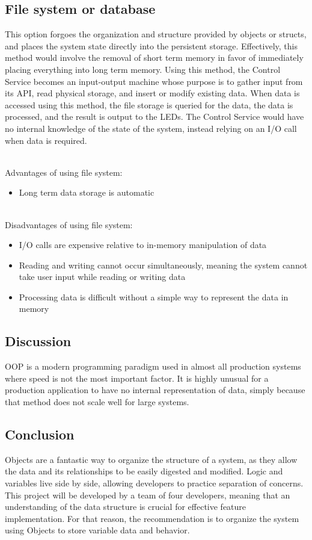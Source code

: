 \documentclass[onecolumn, draftclsnofoot,10pt, compsoc]{IEEEtran}
\begin{document}
			\subsection{File system or database}
			This option forgoes the organization and structure provided by objects or structs, and places the system state directly into the persistent storage.
			Effectively, this method would involve the removal of short term memory in favor of immediately placing everything into long term memory.
			Using this method, the Control Service becomes an input-output machine whose purpose is to gather input from its API, read physical storage, and insert or modify existing data.
			When data is accessed using this method, the file storage is queried for the data, the data is processed, and the result is output to the LEDs.
			The Control Service would have no internal knowledge of the state of the system, instead relying on an I/O call when data is required.

			\noindent \\Advantages of using file system:
			\begin{itemize}
				\item Long term data storage is automatic
			\end{itemize}

			\noindent \\Disadvantages of using file system:
			\begin{itemize}
				\item I/O calls are expensive relative to in-memory manipulation of data
				\item Reading and writing cannot occur simultaneously, meaning the system cannot take user input while reading or writing data
				\item Processing data is difficult without a simple way to represent the data in memory
			\end{itemize}


			\subsection{Discussion}
			OOP is a modern programming paradigm used in almost all production systems where speed is not the most important factor.
			It is highly unusual for a production application to have no internal representation of data, simply because that method does not scale well for large systems.

			\subsection{Conclusion}
			Objects are a fantastic way to organize the structure of a system, as they allow the data and its relationships to be easily digested and modified.
			Logic and variables live side by side, allowing developers to practice separation of concerns.
			This project will be developed by a team of four developers, meaning that an understanding of the data structure is crucial for effective feature implementation.
			For that reason, the recommendation is to organize the system using Objects to store variable data and behavior.


		
		
\end{document}
